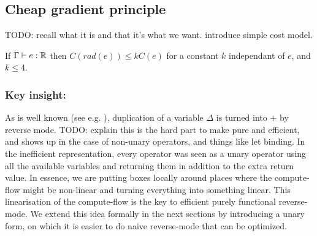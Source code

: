 \subsection{Cheap gradient principle}

TODO: recall what it is and that it's what we want. introduce simple cost model.

\begin{proposition}
    If $\Gamma\vdash e:\mathbb{R}$ then $C(rad(e))\leq k C(e)$ for a constant $k$ independant of $e$, and $k\leq4$.
\end{proposition}

\subsubsection*{Key insight:}

As is well known (see e.g. \cite{pearlmutter2008reverse}), duplication of a variable $\Delta$ is turned into $+$ by reverse mode.
TODO: explain this is the hard part to make pure and efficient, and shows up in the case of non-unary operators, and things like let binding.
In the inefficient representation, every operator was seen as a unary operator using all the available variables and returning them in addition to the extra return value. 
In essence, we are putting boxes locally around places where the compute-flow might be non-linear and turning everything into something linear.
This linearisation of the compute-flow is the key to efficient purely functional reverse-mode. We extend this idea formally in the next sections by introducing a unary form, 
on which it is easier to do naive reverse-mode that can be optimized. 